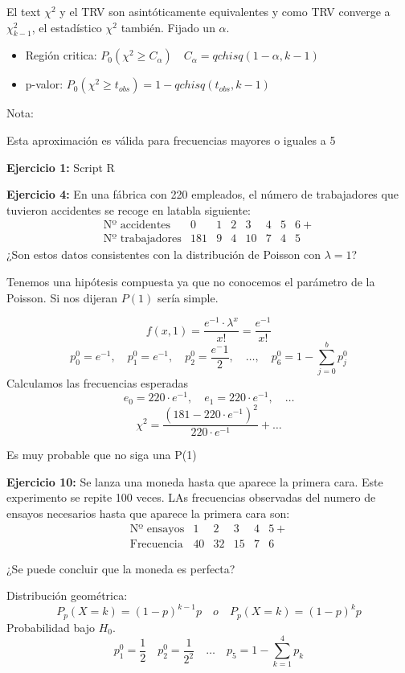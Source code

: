 
El text $\chi^2$ y el TRV son asintóticamente equivalentes y como TRV converge a $\chi^2_{k-1}$, el estadístico $\chi^2$ también.
Fijado un $\alpha$.
\begin{itemize}
    \item Región critica: $P_0(\chi^2 \geq C_\alpha) \quad C_\alpha=qchisq(1-\alpha,k-1)$
    \item p-valor: $P_0(\chi^2 \geq t_{obs})=1-qchisq(t_{obs},k-1)$
\end{itemize}

Nota:

Esta aproximación es válida para frecuencias mayores o iguales a 5

\textbf{Ejercicio 1:} Script R

\textbf{Ejercicio 4:} En una fábrica con 220 empleados, el número de trabajadores que tuvieron accidentes se recoge en latabla siguiente:
\[
\begin{matrix}
    \text{Nº accidentes} & 0& 1& 2& 3&  4& 5& 6+\\
    \text{Nº trabajadores}&  181& 9& 4&10&7&4&5
\end{matrix}
\]
¿Son estos datos consistentes con la distribución de Poisson con $\lambda=1$?

Tenemos una hipótesis compuesta ya que no conocemos el parámetro de la Poisson.
Si nos dijeran $P(1)$ sería simple.

\[
f(x,1)=\frac{e^{-1}\cdot \lambda^x}{x!}=\frac{e^{-1}}{x!}
\]
\[
p_0^0=e^{-1} ,\quad p_1^0=e^{-1} ,\quad p_2^0=\frac{e^-1}{2} ,\quad \dots,\quad p_6^0=1-\sum_{j=0}^{b}p_j^0
\]
Calculamos las frecuencias esperadas
\[
e_0=220 \cdot e^{-1},\quad e_1=220 \cdot e^{-1}, \quad \dots
\]
\[
\chi^2=\frac{(181-220 \cdot e^{-1})^2}{220 \cdot e^{-1}}+\dots
\]

Es muy probable que no siga una P(1)

\textbf{Ejercicio 10:} Se lanza una moneda hasta que aparece la primera cara. Este experimento se repite 100 veces. LAs frecuencias observadas del numero de ensayos necesarios hasta que aparece la primera cara son:
\[
\begin{matrix}
    \text{Nº ensayos} & 1& 2& 3& 4&5+\\
    \text{Frecuencia} &40&32&15&7& 6
\end{matrix}
\]

¿Se puede concluir que la moneda es perfecta?

Distribución geométrica:
\[
P_p(X=k)=(1-p)^{k-1}p \quad o \quad P_p(X=k)=(1-p)^{k}p
\]
Probabilidad bajo $H_0$.
\[
p_1^0=\frac{1}{2} \quad p_2^0=\frac{1}{2^2} \quad \dots \quad p_5=1-\sum_{k=1}^{4} p_k
\]



 